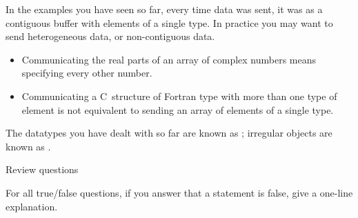 

In the examples you have seen so far, every time data was sent,
it was as a contiguous buffer with elements of a single type.
In practice you may want to send heterogeneous data, or
non-contiguous data.
\begin{itemize}
\item Communicating the real parts of an array of complex numbers
  means specifying every other number.
\item Communicating a C~structure of Fortran type with more than one
  type of element is not equivalent to sending an array of elements of
  a single type.
\end{itemize}
The datatypes you have dealt with so far are known as
; irregular objects
are known as .








 {Review questions}

For all true/false questions, if you answer that a statement is false,
give a one-line explanation.

